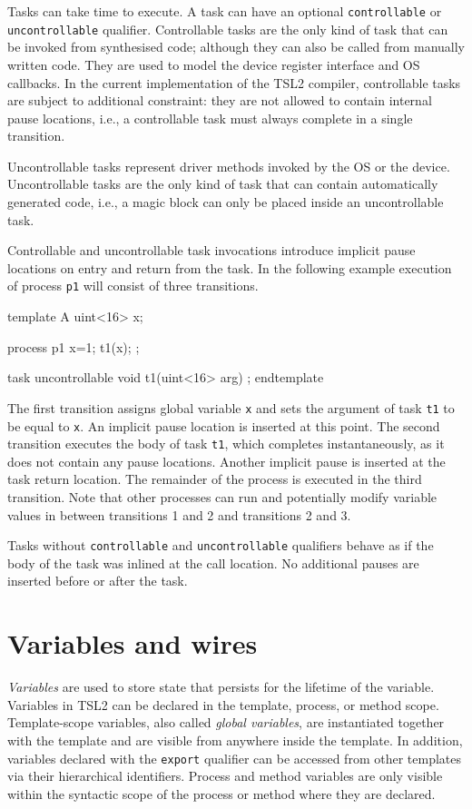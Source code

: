 \documentclass{report}
\newcommand{\src}[1]{\texttt{#1}}
\newcommand{\tsl}{TSL2 }
\begin{document}
Tasks can take time to execute.  A task can have an optional 
\src{controllable} or \src{uncontrollable} qualifier.  
Controllable tasks are the only kind of task that can be invoked 
from synthesised code; although they can also be called from 
manually written code.  They are used to model the device register 
interface and OS callbacks.  In the current implementation of the 
\tsl compiler, controllable tasks are subject to additional 
constraint: they are not allowed to contain internal pause 
locations, i.e., a controllable task must always complete in a 
single transition. 

Uncontrollable tasks represent driver methods invoked by the OS or 
the device.  Uncontrollable tasks are the only kind of task that 
can contain automatically generated code, i.e., a magic block can 
only be placed inside an uncontrollable task.  

Controllable and uncontrollable task invocations introduce 
implicit pause locations on entry and return from the task.  In 
the following example execution of process \src{p1} will consist 
of three transitions.
\begin{tsllisting}{}
template A
  uint<16> x;

  process p1 {
    x=1;
    t1(x);
  };

  task uncontrollable void t1(uint<16> arg) {};
endtemplate
\end{tsllisting}
The first transition assigns global variable \src{x} and sets the 
argument of task \src{t1} to be equal to \src{x}.   An implicit 
pause location is inserted at this point.  The second transition 
executes the body of task \src{t1}, which completes 
instantaneously, as it does not contain any pause locations.  
Another implicit pause is inserted at the task return location.  
The remainder of the process is executed in the third transition.  
Note that other processes can run and potentially modify variable 
values in between transitions 1 and 2 and transitions 2 and 3.

Tasks without \src{controllable} and \src{uncontrollable} 
qualifiers behave as if the body of the task was inlined at the 
call location.  No additional pauses are inserted before or after 
the task.

\section{Variables and wires}\label{s:o:variables}

\emph{Variables} are used to store state that persists for the 
lifetime of the variable.  Variables in \tsl can be declared in 
the template, process, or method scope.  Template-scope variables, 
also called \emph{global variables}, are instantiated together 
with the template and are visible from anywhere inside the 
template.  In addition, variables declared with the \src{export} 
qualifier can be accessed from other templates via their 
hierarchical identifiers.  Process and method variables are only 
visible within the syntactic scope of the process or method where 
they are declared.
\end{document}
